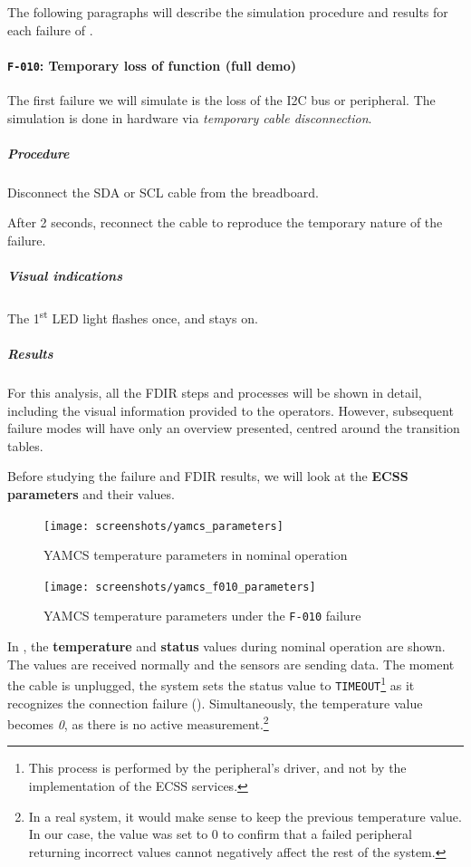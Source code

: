 \documentclass[a4paper,nobib,final]{tufte-book}
\begin{document}
\clearpage
The following paragraphs will describe the simulation procedure and results for each failure of .

\paragraph{\textbf{\texttt{F-010}: Temporary loss of function (full demo)}}\hspace{0pt}

The first failure we will simulate is the loss of the \acs{I2C} bus or peripheral. The simulation is done in hardware via \emph{temporary cable disconnection}.

\subparagraph{Procedure}
\begin{compactenum}
	\item Disconnect the \acs{SDA} or \acs{SCL} cable from the breadboard.
	\item After 2 seconds, reconnect the cable to reproduce the temporary nature of the failure.
\end{compactenum}

\subparagraph{Visual indications} The 1\textsuperscript{st} \acs{LED} light flashes once, and stays on.

\subparagraph{Results}
For this analysis, all the \acs{FDIR} steps and processes will be shown in detail, including the visual information provided to the operators. However, subsequent failure modes will have only an overview presented, centred around the transition tables.

Before studying the failure and \acs{FDIR} results, we will look at the \textbf{\acs{ECSS} parameters} and their values.

\begin{figure}[h]
	\centering
	\texttt{[image: screenshots/yamcs\_parameters]}
	\caption{\acs{YAMCS} temperature parameters in nominal operation}
	\label{fig:yamcsparametersnominal}
\end{figure}

\begin{figure}[h]
	\centering
	\texttt{[image: screenshots/yamcs\_f010\_parameters]}
	\caption{\acs{YAMCS} temperature parameters under the \texttt{F-010} failure}
	\label{fig:yamcsparametersf010}
\end{figure}

In , the \textbf{temperature} and \textbf{status} values during nominal operation are shown. The values are received normally and the sensors are sending data. The moment the cable is unplugged, the system sets the status value to \texttt{TIMEOUT}\footnote{This process is performed by the peripheral's driver, and not by the implementation of the \acs{ECSS} services.} as it recognizes the connection failure (). Simultaneously, the temperature value becomes \emph{0}, as there is no active measurement.\footnote{In a real system, it would make sense to keep the previous temperature value. In our case, the value was set to 0 to confirm that a failed peripheral returning incorrect values cannot negatively affect the rest of the system.}
\end{document}
